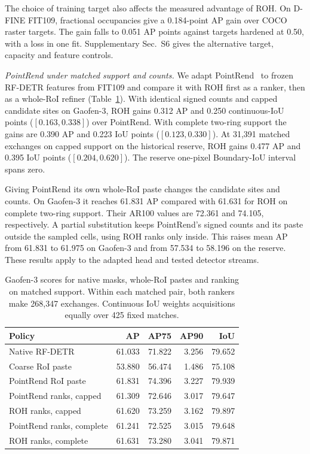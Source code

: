 \documentclass[journal]{IEEEtran}
\begin{document}
The choice of training target also affects the measured advantage of ROH. On D-FINE FIT109, fractional occupancies give a 0.184-point AP gain over COCO raster targets. The gain falls to 0.051 AP points against targets hardened at 0.50, with a loss in one fit. Supplementary Sec.~S6 gives the alternative target, capacity and feature controls.

\textit{PointRend under matched support and counts.}
We adapt PointRend~\cite{pointrend} to frozen RF-DETR features from FIT109 and compare it with ROH first as a ranker, then as a whole-RoI refiner (Table~\ref{tab:rsdd-pointrend}). With identical signed counts and capped candidate sites on Gaofen-3, ROH gains 0.312 AP and 0.250 continuous-IoU points (\([0.163,0.338]\)) over PointRend. With complete two-ring support the gains are 0.390 AP and 0.223 IoU points (\([0.123,0.330]\)). At 31,391 matched exchanges on capped support on the historical reserve, ROH gains 0.477 AP and 0.395 IoU points (\([0.204,0.620]\)). The reserve one-pixel Boundary-IoU interval spans zero.

Giving PointRend its own whole-RoI paste changes the candidate sites and counts. On Gaofen-3 it reaches 61.831 AP compared with 61.631 for ROH on complete two-ring support. Their AR100 values are 72.361 and 74.105, respectively. A partial substitution keeps PointRend's signed counts and its paste outside the sampled cells, using ROH ranks only inside. This raises mean AP from 61.831 to 61.975 on Gaofen-3 and from 57.534 to 58.196 on the reserve. These results apply to the adapted head and tested detector streams.

\begin{table}[t]
\centering
\caption{Gaofen-3 scores for native masks, whole-RoI pastes and ranking on matched support. Within each matched pair, both rankers make 268,347 exchanges. Continuous IoU weights acquisitions equally over 425 fixed matches.}
\label{tab:rsdd-pointrend}
\setlength{\tabcolsep}{4pt}
\begin{tabular}{lrrrr}
\toprule
Policy & AP & AP75 & AP90 & IoU\\
\midrule
Native RF-DETR & 61.033 & 71.822 & 3.256 & 79.652\\
Coarse RoI paste & 53.880 & 56.474 & 1.486 & 75.108\\
PointRend RoI paste & 61.831 & 74.396 & 3.227 & 79.939\\
\midrule
PointRend ranks, capped & 61.309 & 72.646 & 3.017 & 79.647\\
ROH ranks, capped & 61.620 & 73.259 & 3.162 & 79.897\\
PointRend ranks, complete & 61.241 & 72.525 & 3.015 & 79.648\\
ROH ranks, complete & 61.631 & 73.280 & 3.041 & 79.871\\
\bottomrule
\end{tabular}
\end{table}
\end{document}
